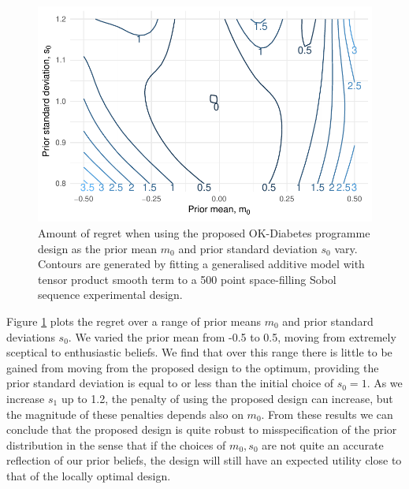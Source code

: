 \documentclass[sagev, Crown]{sagej}
\begin{document}
\begin{figure}
\centering
\includegraphics[scale=0.8]{./figures/sens_p.pdf}
\caption{Amount of regret when using the proposed OK-Diabetes programme design as the prior mean $m_0$ and prior standard deviation $s_0$ vary. Contours are generated by fitting a generalised additive model with tensor product smooth term to a 500 point space-filling Sobol sequence experimental design.}
\label{fig:sens_p}
\end{figure} 

Figure \ref{fig:sens_p} plots the regret over a range of prior means $m_0$ and prior standard deviations $s_0$. We varied the prior mean from -0.5 to 0.5, moving from extremely sceptical to enthusiastic beliefs. We find that over this range there is
 little to be gained from moving from the proposed design to the optimum, providing the prior standard deviation is equal to or less than the initial choice of $s_0 = 1$. As we increase $s_1$ up to 1.2, the penalty of using the proposed design can increase, but the magnitude of these penalties depends also on $m_0$. From these results we can conclude that the proposed design is quite robust to misspecification of the prior distribution in the sense that if the choices of $m_0, s_0$ are not quite an accurate reflection of our prior beliefs, the design will still have an expected utility close to that of the locally optimal design.
\end{document}
